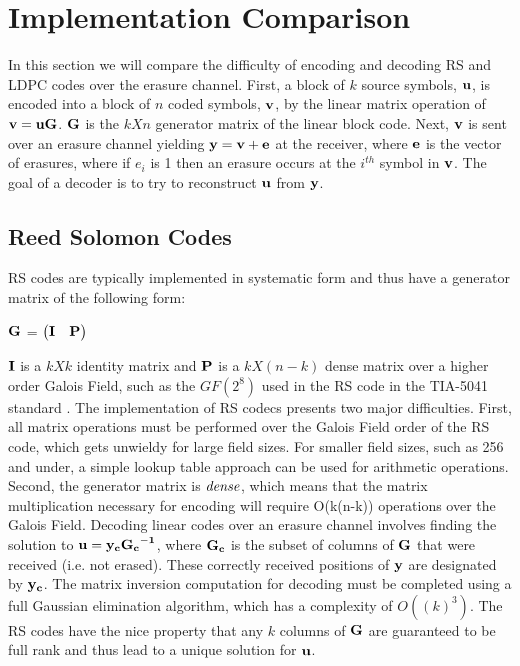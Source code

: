 \documentclass[conference]{IEEEtran}
\begin{document}
\section{Implementation Comparison}\label{sec:TheoreticalImplementation}

In this section we will compare the difficulty of encoding and decoding RS and LDPC codes over the erasure channel.  First, a block of $k$ source symbols, $\bf{u}$, is encoded into a block of $n$ coded symbols, $\bf{v}$, by the linear matrix operation of $\bf{v}=\bf{u}\bf{G}$.  $\bf{G}$ is the $k X n$ generator matrix of the linear block code.  Next, $\bf{v}$ is sent over an erasure channel yielding $\bf{y} = \bf{v} + \bf{e}$ at the receiver, where $\bf{e}$ is the vector of erasures, where if $e_i$ is 1 then an erasure occurs at the $i^{th}$ symbol in $\bf{v}$.  The goal of a decoder is to try to reconstruct $\bf{u}$ from $\bf{y}$.

\subsection{Reed Solomon Codes}\label{sec_RS}

RS codes are typically implemented in systematic form and thus have a generator matrix of the following form:

$\bf{G}$ =
$\begin{pmatrix}
 \bf{I} & \bf{P}\\
\end{pmatrix}$

$\bf{I}$ is a $kXk$ identity matrix and $\bf{P}$ is a $kX(n-k)$ dense matrix over a higher order Galois Field, such as the $GF(2^8)$ used in the RS code in the TIA-5041 standard \cite{TIA5041_standard}.
The implementation of RS codecs presents two major difficulties.  First, all matrix operations must be performed over the Galois Field order of the RS code, which gets unwieldy for large field sizes.  For smaller field sizes, such as 256 and under, a simple lookup table approach can be used for arithmetic operations.  Second, the generator matrix is $\it{dense}$, which means that the matrix multiplication necessary for encoding will require O(k(n-k)) operations over the Galois Field.  Decoding linear codes over an erasure channel involves finding the solution to $\bf{u} = \bf{y}_c{\bf{G}_c}^{-1}$, where $\bf{G}_c$ is the subset of columns of $\bf{G}$ that were received (i.e. not erased).  These correctly received positions of $\bf{y}$ are designated by $\bf{y}_c$.  The matrix inversion computation for decoding must be completed using a full Gaussian elimination algorithm, which has a complexity of $O((k)^3)$.  The RS codes have the nice property that any $k$ columns of $\bf{G}$ are guaranteed to be full rank and thus lead to a unique solution for $\bf{u}$.
\end{document}
